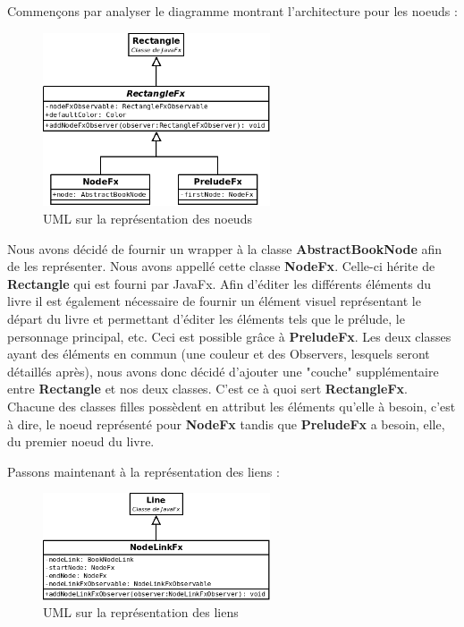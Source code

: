 				Commençons par analyser le diagramme montrant l'architecture pour les noeuds :

				\begin{figure}[H]
					\centering\includegraphics[width=0.6\textwidth, keepaspectratio]{img/NodeFx.png}
					\caption{UML sur la représentation des noeuds}
				\end{figure}

				Nous avons décidé de fournir un wrapper à la classe \textbf{AbstractBookNode} afin de les représenter. Nous avons appellé cette classe \textbf{NodeFx}. Celle-ci hérite de \textbf{Rectangle} qui est fourni par JavaFx. Afin d'éditer les différents éléments du livre il est également nécessaire de fournir un élément visuel représentant le départ du livre et permettant d'éditer les éléments tels que le prélude, le personnage principal, etc. Ceci est possible grâce à \textbf{PreludeFx}. Les deux classes ayant des éléments en commun (une couleur et des Observers, lesquels seront détaillés après), nous avons donc décidé d'ajouter une "couche" supplémentaire entre \textbf{Rectangle} et nos deux classes. C'est ce à quoi sert \textbf{RectangleFx}. Chacune des classes filles possèdent en attribut les éléments qu'elle à besoin, c'est à dire, le noeud représenté pour \textbf{NodeFx} tandis que \textbf{PreludeFx} a besoin, elle, du premier noeud du livre.

				Passons maintenant à la représentation des liens :

				\begin{figure}[H]
					\centering\includegraphics[width=0.6\textwidth, keepaspectratio]{img/NodeLinkFx.png}
					\caption{UML sur la représentation des liens}
				\end{figure}

